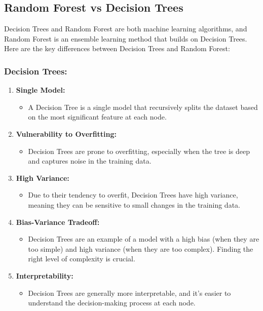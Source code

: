 \documentclass[
]{book}
\providecommand{\tightlist}{%
  \setlength{\itemsep}{0pt}\setlength{\parskip}{0pt}}
\begin{document}
\hypertarget{random-forest-vs-decision-trees}{%
\subsection{Random Forest vs Decision Trees}\label{random-forest-vs-decision-trees}}

Decision Trees and Random Forest are both machine learning algorithms, and Random Forest is an ensemble learning method that builds on Decision Trees. Here are the key differences between Decision Trees and Random Forest:

\hypertarget{decision-trees}{%
\subsubsection{Decision Trees:}\label{decision-trees}}

\begin{enumerate}
\def\labelenumi{\arabic{enumi}.}
\tightlist
\item
  \textbf{Single Model:}

  \begin{itemize}
  \tightlist
  \item
    A Decision Tree is a single model that recursively splits the dataset based on the most significant feature at each node.
  \end{itemize}
\item
  \textbf{Vulnerability to Overfitting:}

  \begin{itemize}
  \tightlist
  \item
    Decision Trees are prone to overfitting, especially when the tree is deep and captures noise in the training data.
  \end{itemize}
\item
  \textbf{High Variance:}

  \begin{itemize}
  \tightlist
  \item
    Due to their tendency to overfit, Decision Trees have high variance, meaning they can be sensitive to small changes in the training data.
  \end{itemize}
\item
  \textbf{Bias-Variance Tradeoff:}

  \begin{itemize}
  \tightlist
  \item
    Decision Trees are an example of a model with a high bias (when they are too simple) and high variance (when they are too complex). Finding the right level of complexity is crucial.
  \end{itemize}
\item
  \textbf{Interpretability:}

  \begin{itemize}
  \tightlist
  \item
    Decision Trees are generally more interpretable, and it's easier to understand the decision-making process at each node.
  \end{itemize}
\end{enumerate}
\end{document}
